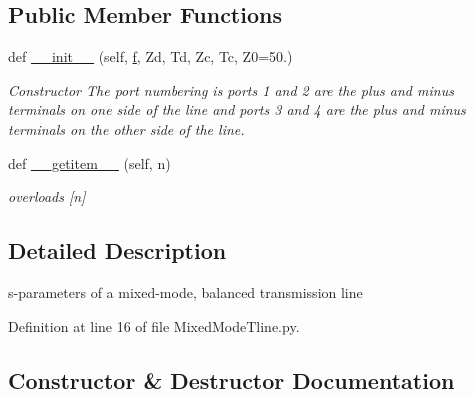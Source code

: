 \subsection*{Public Member Functions}
\begin{DoxyCompactItemize}
\item 
def \hyperlink{classSignalIntegrity_1_1SParameters_1_1Devices_1_1MixedModeTline_1_1MixedModeTLine_a9c295f4e84010f80b42cbb02c9ed5b5a}{\+\_\+\+\_\+init\+\_\+\+\_\+} (self, \hyperlink{classSignalIntegrity_1_1SParameters_1_1SParameters_1_1SParameters_a32e7a34d6837fe949b413c852a0447f8}{f}, Zd, Td, Zc, Tc, Z0=50.)
\begin{DoxyCompactList}\small\item\em Constructor The port numbering is ports 1 and 2 are the plus and minus terminals on one side of the line and ports 3 and 4 are the plus and minus terminals on the other side of the line. \end{DoxyCompactList}\item 
def \hyperlink{classSignalIntegrity_1_1SParameters_1_1Devices_1_1MixedModeTline_1_1MixedModeTLine_ab7a6da5139e0878b590d68292aaa70f2}{\+\_\+\+\_\+getitem\+\_\+\+\_\+} (self, n)
\begin{DoxyCompactList}\small\item\em overloads \mbox{[}n\mbox{]} \end{DoxyCompactList}\end{DoxyCompactItemize}


\subsection{Detailed Description}
s-\/parameters of a mixed-\/mode, balanced transmission line 

Definition at line 16 of file Mixed\+Mode\+Tline.\+py.



\subsection{Constructor \& Destructor Documentation}
\mbox{\label{classSignalIntegrity_1_1SParameters_1_1Devices_1_1MixedModeTline_1_1MixedModeTLine_a9c295f4e84010f80b42cbb02c9ed5b5a}} 
